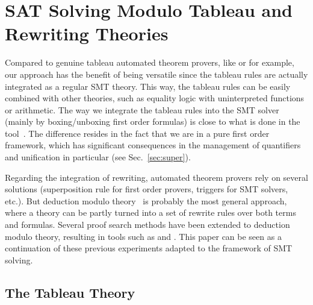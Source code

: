 
\section{SAT Solving Modulo Tableau and Rewriting Theories}
\label{sec:smt}

Compared to genuine tableau automated theorem provers, like \princess{} or
\zenon{} for example, our approach has the benefit of being versatile since the
tableau rules are actually integrated as a regular SMT theory. This way, the
tableau rules can be easily combined with other theories, such as equality logic
with uninterpreted functions or arithmetic. The way we integrate the tableau
rules into the SMT solver (mainly by boxing/unboxing first order formulas) is
close to what is done in the \satallax{} tool~\cite{CEB12}. The difference
resides in the fact that we are in a pure first order framework, which has
significant consequences in the management of quantifiers and unification in
particular (see Sec.~\ref{sec:super}).

Regarding the integration of rewriting, automated theorem provers rely on
several solutions (superposition rule for first order provers, triggers for SMT
solvers, etc.). But deduction modulo theory~\cite{DA03} is probably the most
general approach, where a theory can be partly turned into a set of rewrite
rules over both terms and formulas. Several proof search methods have been
extended to deduction modulo theory, resulting in tools such as \iproverm{} and
\zenm{}. This paper can be seen as a continuation of these previous experiments
adapted to the framework of SMT solving.

\subsection{The Tableau Theory}
\label{sec:tab}

